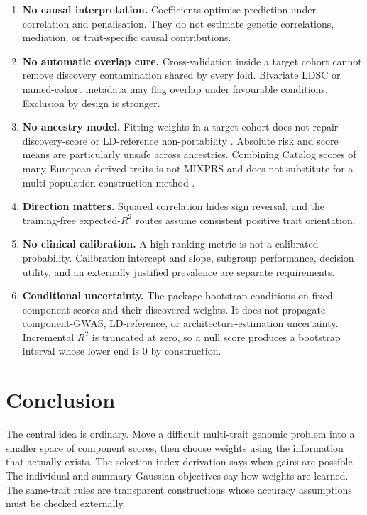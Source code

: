 \documentclass[11pt,a4paper]{article}
\newcommand{\Rtwo}{\(R^2\)}
\begin{document}
\begin{enumerate}
  \item \textbf{No causal interpretation.} Coefficients optimise
  prediction under correlation and penalisation. They do not
  estimate genetic correlations, mediation, or trait-specific
  causal contributions.
  \item \textbf{No automatic overlap cure.} Cross-validation
  inside a target cohort cannot remove discovery contamination
  shared by every fold. Bivariate LDSC or named-cohort metadata
  may flag overlap under favourable conditions. Exclusion by
  design is stronger.
  \item \textbf{No ancestry model.} Fitting weights in a target
  cohort does not repair discovery-score or LD-reference
  non-portability \cite{martin2019}. Absolute risk and score
  means are particularly unsafe across ancestries. Combining
  Catalog scores of many European-derived traits is not MIXPRS
  and does not substitute for a multi-population construction
  method \cite{xu2026}.
  \item \textbf{Direction matters.} Squared correlation hides
  sign reversal, and the training-free expected-\Rtwo{} routes
  assume consistent positive trait orientation.
  \item \textbf{No clinical calibration.} A high ranking metric
  is not a calibrated probability. Calibration intercept and
  slope, subgroup performance, decision utility, and an
  externally justified prevalence are separate requirements.
  \item \textbf{Conditional uncertainty.} The package bootstrap
  conditions on fixed component scores and their discovered
  weights. It does not propagate component-GWAS, LD-reference,
  or architecture-estimation uncertainty. Incremental \Rtwo{} is
  truncated at zero, so a null score produces a bootstrap
  interval whose lower end is \(0\) by construction.
\end{enumerate}

\section{Conclusion}
\label{sec:conclusion}

The central idea is ordinary. Move a difficult multi-trait
genomic problem into a smaller space of component scores, then
choose weights using the information that actually exists. The
selection-index derivation says when gains are possible. The
individual and summary Gaussian objectives say how weights are
learned. The same-trait rules are transparent constructions
whose accuracy assumptions must be checked externally.
\end{document}
